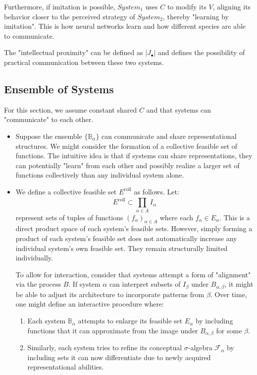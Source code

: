 \documentclass[]{article}
\begin{document}
Furthermore, if imitation is possible, $System_1$ uses $C$ to modify its $V$, aligning its behavior closer to the perceived strategy of $System_2$, thereby "learning by imitation". This is how neural networks learn and how different species are able to communicate.

The "intellectual proximity" can be defined as $|J_\bullet|$ and defines the possibility of practical communication between these two systems.

\subsection{Ensemble of Systems}
For this section, we assume constant shared $C$ and that systems can "communicate" to each other.
\begin{itemize}
	\item Suppose the ensemble $\{ \mathbb{B}_\alpha \}$ can communicate and share representational structures. We might consider the formation of a collective feasible set of functions. The intuitive idea is that if systems can share representations, they can potentially "learn" from each other and possibly realize a larger set of functions collectively than any individual system alone.
	\item We define a collective feasible set $E^{\text{coll}}$ as follows. Let:
	\[ E^{\text{coll}} \subset \prod_{\alpha \in A}^{} I_\alpha \]
	represent sets of tuples of functions $(f_\alpha)_{\alpha \in A}$ where each $f_\alpha \in E_\alpha$. This is a direct product space of each system’s feasible sets. However, simply forming a product of each system’s feasible set does not automatically increase any individual system’s own feasible set. They remain structurally limited individually.
	
	To allow for interaction, consider that systems attempt a form of "alignment" via the process $B$. If system $\alpha$ can interpret subsets of $I_\beta$ under $B_{\alpha,\beta}$, it might be able to adjust its architecture to incorporate patterns from $\beta$. Over time, one might define an interactive procedure where:
	\begin{enumerate}
		\item Each system $\mathbb{B}_\alpha$ attempts to enlarge its feasible set $E_\alpha$ by including functions that it can approximate from the image under $B_{\alpha,\beta}$ for some $\beta$.
		\item Similarly, each system tries to refine its conceptual $\sigma$-algebra $\mathcal{F}_\alpha$ by including sets it can now differentiate due to newly acquired representational abilities.
	\end{enumerate}
	

\end{itemize}
\end{document}
